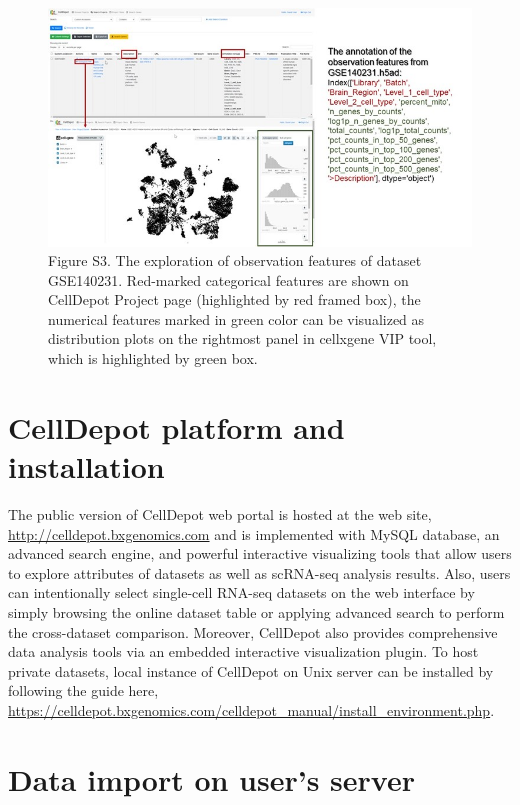 \documentclass[
]{book}
\begin{document}
\begin{figure}
\centering
\includegraphics{figures/S3.jpg}
\caption{Figure S3. The exploration of observation features of dataset GSE140231. Red-marked categorical features are shown on CellDepot Project page (highlighted by red framed box), the numerical features marked in green color can be visualized as distribution plots on the rightmost panel in cellxgene VIP tool, which is highlighted by green box.}
\end{figure}

\hypertarget{celldepot-platform-and-installation}{%
\section{CellDepot platform and installation}\label{celldepot-platform-and-installation}}

The public version of CellDepot web portal is hosted at the web site, \url{http://celldepot.bxgenomics.com} and is implemented with MySQL database, an advanced search engine, and powerful interactive visualizing tools that allow users to explore attributes of datasets as well as scRNA-seq analysis results. Also, users can intentionally select single-cell RNA-seq datasets on the web interface by simply browsing the online dataset table or applying advanced search to perform the cross-dataset comparison. Moreover, CellDepot also provides comprehensive data analysis tools via an embedded interactive visualization plugin. To host private datasets, local instance of CellDepot on Unix server can be installed by following the guide here, \url{https://celldepot.bxgenomics.com/celldepot_manual/install_environment.php}.

\hypertarget{data-import-on-users-server}{%
\section{Data import on user's server}\label{data-import-on-users-server}}
\end{document}
